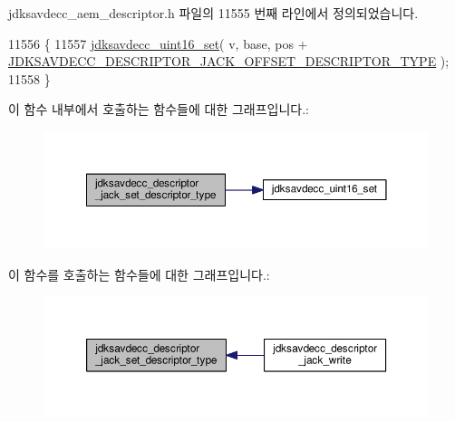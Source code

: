 jdksavdecc\+\_\+aem\+\_\+descriptor.\+h 파일의 11555 번째 라인에서 정의되었습니다.


\begin{DoxyCode}
11556 \{
11557     \hyperlink{group__endian_ga14b9eeadc05f94334096c127c955a60b}{jdksavdecc\_uint16\_set}( v, base, pos + 
      \hyperlink{group__descriptor__jack_ga4763bc671c963f3313407a0b762f115e}{JDKSAVDECC\_DESCRIPTOR\_JACK\_OFFSET\_DESCRIPTOR\_TYPE} );
11558 \}
\end{DoxyCode}


이 함수 내부에서 호출하는 함수들에 대한 그래프입니다.\+:
\nopagebreak
\begin{figure}[H]
\begin{center}
\leavevmode
\includegraphics[width=350pt]{group__descriptor__jack_gaa126ded038d591375b4f4fe13c376b74_cgraph}
\end{center}
\end{figure}




이 함수를 호출하는 함수들에 대한 그래프입니다.\+:
\nopagebreak
\begin{figure}[H]
\begin{center}
\leavevmode
\includegraphics[width=350pt]{group__descriptor__jack_gaa126ded038d591375b4f4fe13c376b74_icgraph}
\end{center}
\end{figure}


